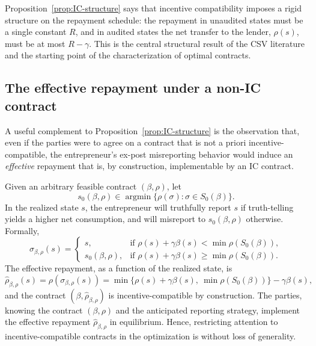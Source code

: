 \documentclass[11pt,a4paper,oneside]{book}
\def\geq{\geqslant}
\DeclareMathOperator*{\argmin}{argmin}
\theoremstyle{plain}
\theoremstyle{definition}
\theoremstyle{remark}
\numberwithin{equation}{chapter}
\begin{document}
Proposition~\ref{prop:IC-structure} says that incentive compatibility imposes a rigid structure on the repayment schedule: the repayment in unaudited states must be a single constant $R$, and in audited states the net transfer to the lender, $\rho(s)$, must be at most $R - \gamma$.
This is the central structural result of the CSV literature and the starting point of the characterization of optimal contracts.

\subsection{The effective repayment under a non-IC contract}

A useful complement to Proposition~\ref{prop:IC-structure} is the observation that, even if the parties were to agree on a contract that is not a priori incentive-compatible, the entrepreneur's ex-post misreporting behavior would induce an \emph{effective} repayment that is, by construction, implementable by an IC contract.

Given an arbitrary feasible contract $(\beta, \rho)$, let
\begin{equation*}
  s_0(\beta, \rho) \in \argmin \{ \rho(\sigma) \colon \sigma \in S_0(\beta) \}.
\end{equation*}
In the realized state $s$, the entrepreneur will truthfully report $s$ if truth-telling yields a higher net consumption, and will misreport to $s_0(\beta, \rho)$ otherwise.
Formally,
\begin{equation*}
  \sigma_{\beta, \rho}(s)
  = \begin{cases}
    s, & \text{if } \rho(s) + \gamma \beta(s) < \min \rho(S_0(\beta)), \\
    s_0(\beta, \rho), & \text{if } \rho(s) + \gamma \beta(s) \geq \min \rho(S_0(\beta)).
  \end{cases}
\end{equation*}
The effective repayment, as a function of the realized state, is
\begin{equation}\label{eq:effective-rho}
  \widehat{\rho}_{\beta, \rho}(s) = \rho(\sigma_{\beta, \rho}(s))
  = \min\bigl\{ \rho(s) + \gamma \beta(s), \ \min \rho(S_0(\beta)) \bigr\} - \gamma \beta(s),
\end{equation}
and the contract $(\beta, \widehat{\rho}_{\beta, \rho})$ is incentive-compatible by construction.
The parties, knowing the contract $(\beta, \rho)$ and the anticipated reporting strategy, implement the effective repayment $\widehat{\rho}_{\beta, \rho}$ in equilibrium.
Hence, restricting attention to incentive-compatible contracts in the optimization is without loss of generality.
\end{document}
